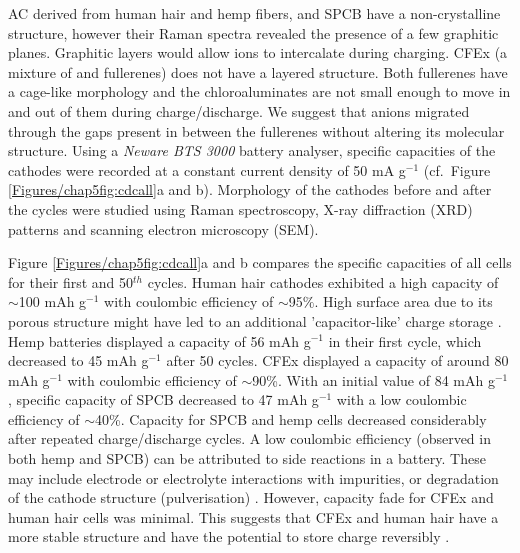 AC derived from human hair and hemp fibers, and SPCB have a non-crystalline structure, however their Raman spectra revealed the presence of a few graphitic planes. Graphitic layers would allow  ions to intercalate during charging. CFEx (a mixture of  and  fullerenes) does not have a layered structure. Both fullerenes have a cage-like morphology and the chloroaluminates are not small enough to move in and out of them during charge/discharge. We suggest that  anions migrated through the gaps present in between the fullerenes without altering its molecular structure. Using a \textit{Neware BTS 3000} battery analyser, specific capacities of the cathodes were recorded at a constant current density of 50 mA g$^{-1}$ (cf.\ Figure \ref{Figures/chap5fig:cdcall}a and b). Morphology of the cathodes before and after the cycles were studied using Raman spectroscopy, X-ray diffraction (XRD) patterns and scanning electron microscopy (SEM).

Figure \ref{Figures/chap5fig:cdcall}a and b compares the specific capacities of all cells for their first and 50$^{th}$ cycles. Human hair cathodes exhibited a high capacity of $\sim$100 mAh g$^{-1}$ with coulombic efficiency of $\sim$95$\%$. High surface area due to its porous structure might have led to an additional 'capacitor-like' charge storage \cite{frackowiak_carbon_2001}. Hemp batteries displayed a capacity of 56 mAh g$^{-1}$ in their first cycle, which decreased to 45 mAh g$^{-1}$ after 50 cycles. CFEx displayed a capacity of around 80 mAh g$^{-1}$ with coulombic efficiency of $\sim$90\%. With an initial value of 84 mAh g$^{-1}$, specific capacity of SPCB decreased to 47 mAh g$^{-1}$ with a low coulombic efficiency of $\sim$40\%. Capacity for SPCB and hemp cells decreased considerably after repeated charge/discharge cycles. A low coulombic efficiency (observed in both hemp and SPCB) can be attributed to side reactions in a battery. These may include electrode or electrolyte interactions with impurities, or degradation of the cathode structure (pulverisation) \cite{gyenes_understanding_2015-1}. However, capacity fade for CFEx and human hair cells was minimal. This suggests that CFEx and human hair have a more stable structure and have the potential to store charge reversibly \cite{pramanick_human_2016}.\\



